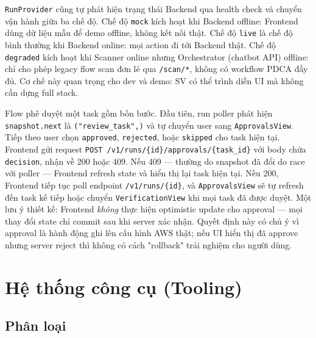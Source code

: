 \texttt{RunProvider} cũng tự phát hiện trạng thái Backend qua health check và chuyển vận hành giữa ba chế độ. Chế độ \texttt{mock} kích hoạt khi Backend offline: Frontend dùng dữ liệu mẫu để demo offline, không kết nối thật. Chế độ \texttt{live} là chế độ bình thường khi Backend online: mọi action đi tới Backend thật. Chế độ \texttt{degraded} kích hoạt khi Scanner online nhưng Orchestrator (chatbot API) offline: chỉ cho phép legacy flow scan đơn lẻ qua \texttt{/scan/*}, không có workflow PDCA đầy đủ. Cơ chế này quan trọng cho dev và demo: SV có thể trình diễn UI mà không cần dựng full stack.

Flow phê duyệt một task gồm bốn bước. Đầu tiên, run poller phát hiện \texttt{snapshot.next} là \texttt{("review\_task",)} và tự chuyển user sang \texttt{ApprovalsView}. Tiếp theo user chọn \texttt{approved}, \texttt{rejected}, hoặc \texttt{skipped} cho task hiện tại. Frontend gửi request \texttt{POST /v1/runs/\{id\}/approvals/\{task\_id\}} với body chứa \texttt{decision}, nhận về 200 hoặc 409. Nếu 409 — thường do snapshot đã đổi do race với poller — Frontend refresh state và hiển thị lại task hiện tại. Nếu 200, Frontend tiếp tục poll endpoint \texttt{/v1/runs/\{id\}}, và \texttt{ApprovalsView} sẽ tự refresh đến task kế tiếp hoặc chuyển \texttt{VerificationView} khi mọi task đã được duyệt. Một lưu ý thiết kế: Frontend \emph{không} thực hiện optimistic update cho approval — mọi thay đổi state chỉ commit sau khi server xác nhận. Quyết định này có chủ ý vì approval là hành động ghi lên cấu hình AWS thật; nếu UI hiển thị đã approve nhưng server reject thì không có cách "rollback" trải nghiệm cho người dùng.



\section{Hệ thống công cụ (Tooling)}
\label{sec:tooling_impl}

\subsection{Phân loại}

